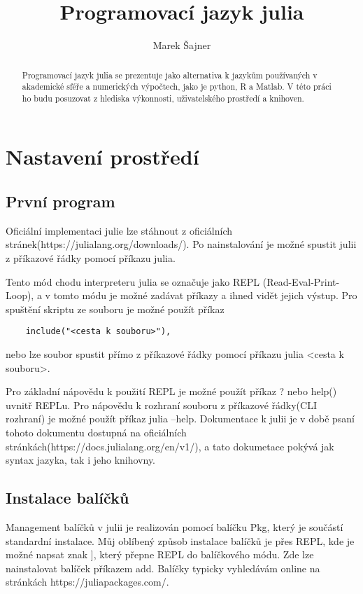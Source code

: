 \documentclass{article}
\title{Programovací jazyk julia}
\author{Marek Šajner}
\begin{document}
\maketitle
\tableofcontents
\begin{abstract}
    Programovací jazyk julia se prezentuje jako alternativa k jazykům používaných v akademické sféře a numerických výpočtech,
    jako je python, R a Matlab.
    V této práci ho budu posuzovat z hlediska výkonnosti, uživatelského prostředí a knihoven.
\end{abstract}
\newpage
\section{Nastavení prostředí}
\subsection{První program}
Oficiální implementaci julie lze stáhnout z oficiálních stránek(https://julialang.org/downloads/).
Po nainstalování je možné spustit julii z příkazové řádky pomocí příkazu julia.

Tento mód chodu interpreteru julia se označuje jako REPL (Read-Eval-Print-Loop),
a v tomto módu je možné zadávat příkazy a ihned vidět jejich výstup.
Pro spuštění skriptu ze souboru je možné použít příkaz
\begin{lstlisting}
    include("<cesta k souboru>"),
\end{lstlisting}
nebo lze soubor spustit přímo z příkazové řádky pomocí příkazu julia <cesta k souboru>.

Pro základní nápovědu k použití REPL je možné použít příkaz ? nebo help() uvnitř REPLu.
Pro nápovědu k rozhraní souboru z příkazové řádky(CLI rozhraní) je možné použít příkaz julia --help.
Dokumentace k julii je v době psaní tohoto dokumentu dostupná na oficiálních stránkách(https://docs.julialang.org/en/v1/),
a tato dokumetace pokývá jak syntax jazyka, tak i jeho knihovny.

\subsection{Instalace balíčků}
Management balíčků v julii je realizován pomocí balíčku Pkg, který je součástí standardní instalace.
Můj oblíbený způsob instalace balíčků je přes REPL, kde je možné napsat znak ], který přepne REPL do balíčkového módu.
Zde lze nainstalovat balíček příkazem add. Balíčky typicky vyhledávám online na stránkách https://juliapackages.com/.
\end{document}
